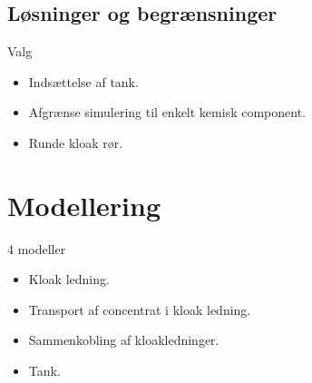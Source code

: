 \subsection{Løsninger og begrænsninger}
\begin{frame}{Valg}{}
\vfill\vfill\centering
\begin{itemize}
	\item<1-> Indsættelse af tank.
	\item<2-> Afgrænse simulering til enkelt kemisk component.
	\item<3-> Runde kloak rør.
\end{itemize}
\vfill\vfill	
\end{frame}

\section{Modellering}

\begin{frame}{4 modeller}{}
	\vfill\vfill\centering
\begin{itemize}
	\item Kloak ledning.
	\item Transport af concentrat i kloak ledning.
	\item Sammenkobling af kloakledninger.
	\item Tank. 
\end{itemize}
\vfill\vfill		
\end{frame}

